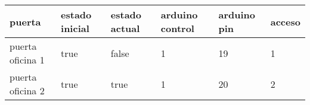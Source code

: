 \tiny
\begin{tabular}{|C{1.2cm}|C{0.8cm}|C{0.8cm}|C{0.8cm}|C{0.8cm}|C{0.8cm}|}
  \hline
  puerta & estado inicial & estado actual & arduino control & arduino pin & acceso \\
  \hline
  puerta oficina 1 & true & false & 1 & 19 & 1 \\
  \hline
  puerta oficina 2 & true & true & 1 & 20 & 2 \\
  \hline
\end{tabular}